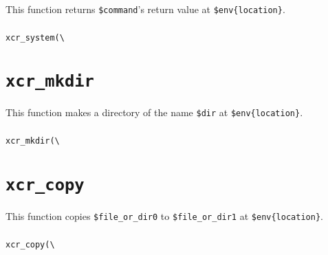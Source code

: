 \documentclass[a4paper,10pt]{report}
\def\|{\verb|} %|
\begin{document}
This function returns \texttt{\$command}'s return value at
\texttt{\$env\{location\}}.

\subsubsection{\format}

\begin{boxnote}
\begin{alltt}
xcr_system(\|\|%\textit{env}, $command);
\end{alltt}
\end{boxnote}
\vspace{\baselineskip}

\section{\texttt{xcr\_mkdir}}

This function makes a directory of the name \texttt{\$dir} at
\texttt{\$env\{location\}}.

\subsubsection{\format}

\begin{boxnote}
\begin{alltt}
xcr_mkdir(\|\|%\textit{env}, $dir);
\end{alltt}
\end{boxnote}
\vspace{\baselineskip}

\section{\texttt{xcr\_copy}}

This function copies \texttt{\$file\_or\_dir0} to
\texttt{\$file\_or\_dir1} at \texttt{\$env\{location\}}.

\subsubsection{\format}

\begin{boxnote}
\begin{alltt}
xcr_copy(\|\|%\textit{env}, $file_or_dir0, $file_or_dir1);
\end{alltt}
\end{boxnote}
\vspace{\baselineskip}
\end{document}
